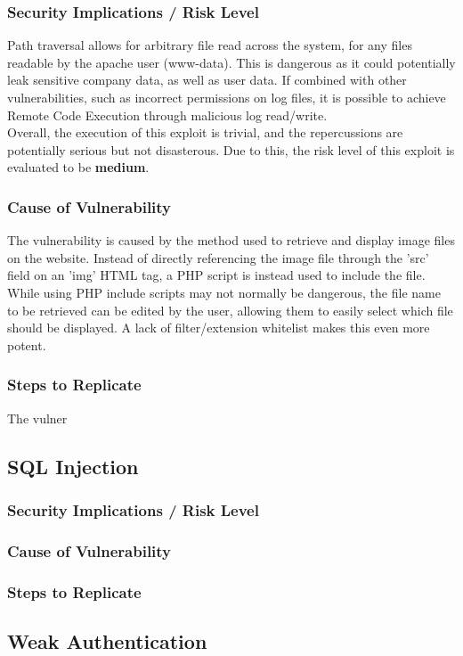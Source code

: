 \documentclass{report}
\begin{document}
\subsubsection{Security Implications / Risk Level}
Path traversal allows for arbitrary file read across the system, for any files readable by the apache user (www-data). This is dangerous as it could potentially leak sensitive company data, as well as user data. If combined with other vulnerabilities, such as incorrect permissions on log files, it is possible to achieve Remote Code Execution through malicious log read/write.\\
Overall, the execution of this exploit is trivial, and the repercussions are potentially serious but not disasterous. Due to this, the risk level of this exploit is evaluated to be \textbf{medium}.
\subsubsection{Cause of Vulnerability}
The vulnerability is caused by the method used to retrieve and display image files on the website. Instead of directly referencing the image file through the 'src' field on an 'img' HTML tag, a PHP script is instead used to include the file.\\ 
While using PHP include scripts may not normally be dangerous, the file name to be retrieved can be edited by the user, allowing them to easily select which file should be displayed. A lack of filter/extension whitelist makes this even more potent.
\subsubsection{Steps to Replicate}
The vulner
\subsection{SQL Injection}
\subsubsection{Security Implications / Risk Level}
\subsubsection{Cause of Vulnerability}
\subsubsection{Steps to Replicate}
\subsection{Weak Authentication}
\end{document}
